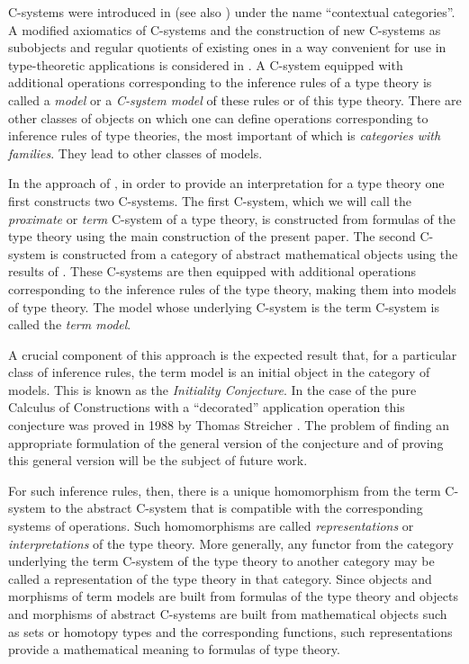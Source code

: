 \documentclass[12pt]{amsart}
\begin{document}
C-systems were introduced in \cite{Cartmell0} (see also \cite{Cartmell1}) under
the name ``contextual categories''. A modified axiomatics of C-systems and the
construction of new C-systems as subobjects and regular quotients of 
existing ones in a way convenient for use in type-theoretic applications is
considered in \cite{Csubsystems}. A C-system equipped with additional
operations corresponding to the inference rules of a type theory is called a
{\em model} or a {\em C-system model} of these rules or of this type theory. There are
other classes of objects on which one can define operations corresponding to
inference rules of type theories, the most important of which is {\em categories with families}.
They lead to other classes of models.

In the approach of \cite{CMUtalk}, in order to provide an interpretation for a
type theory one first constructs two C-systems.  The first C-system, which we will
call the {\em proximate} or {\em term} C-system of a type theory, is constructed from
formulas of the type theory using the main construction of the present paper.
The second C-system is constructed from a category of abstract mathematical
objects using the results of \cite{Cfromauniverse}. These C-systems are then
equipped with additional operations corresponding to the inference rules of the
type theory, making them into models of type theory.  The model whose underlying
C-system is the term C-system is called the {\em term model}.

A crucial component of this approach is the expected result that, for a
particular class of inference rules, the term model is an initial object in the
category of models. This is known as the {\em Initiality Conjecture}. In the case of
the pure Calculus of Constructions with a ``decorated'' application operation
this conjecture was proved in 1988 by Thomas Streicher \cite{Streicher}. The
problem of finding an appropriate formulation of the general version of the
conjecture and of proving this general version will be the subject of future
work.

For such inference rules, then, there is a unique homomorphism from the term
C-system to the abstract C-system that is compatible with the corresponding
systems of operations. Such homomorphisms are called {\em representations} or
{\em interpretations} of the type theory. More generally, any functor from the
category underlying the term C-system of the type theory to another category
may be called a representation of the type theory in that category. Since
objects and morphisms of term models are built from formulas of the type theory
and objects and morphisms of abstract C-systems are built from mathematical
objects such as sets or homotopy types and the corresponding functions, such
representations provide a mathematical meaning to formulas of type theory.
\end{document}
